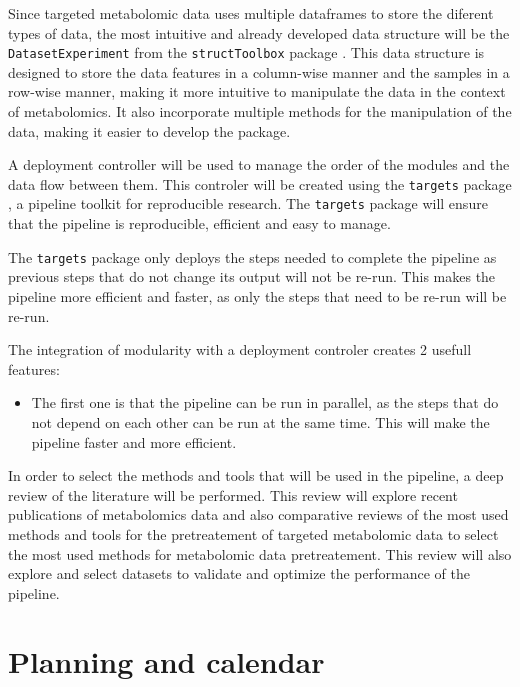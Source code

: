 \documentclass[ENG, BIB]{TFUOC}%
\begin{document}
Since targeted metabolomic data uses multiple dataframes to store the diferent types of data, the most intuitive and already developed data structure will be the \texttt{DatasetExperiment} from the \texttt{structToolbox} package \cite{structToolbox2020}. This data structure is designed to store the data features in a column-wise manner and the samples in a row-wise manner, making it more intuitive to manipulate the data in the context of metabolomics. It also incorporate multiple methods for the manipulation of the data, making it easier to develop the package. 

A deployment controller will be used to manage the order of the modules and the data flow between them. This controler will be created using the \texttt{targets} package \cite{targets2021}, a pipeline toolkit for reproducible research. The \texttt{targets} package will ensure that the pipeline is reproducible, efficient and easy to manage.

The \texttt{targets} package only deploys the steps needed to complete the pipeline as previous steps that do not change its output will not be re-run. This makes the pipeline more efficient and faster, as only the steps that need to be re-run will be re-run. 

The integration of modularity with a deployment controler creates 2 usefull features:

\begin{itemize}
    \item The first one is that the pipeline can be run in parallel, as the steps that do not depend on each other can be run at the same time. This will make the pipeline faster and more efficient.
\end{itemize}


In order to select the methods and tools that will be used in the pipeline, a deep review of the literature will be performed. This review will explore recent publications of metabolomics data and also comparative reviews of the most used methods and tools for the pretreatement of targeted metabolomic data to select the most used methods for metabolomic data pretreatement. This review will also explore and select datasets to validate and optimize the performance of the pipeline.







\section{Planning and calendar}
\end{document}
